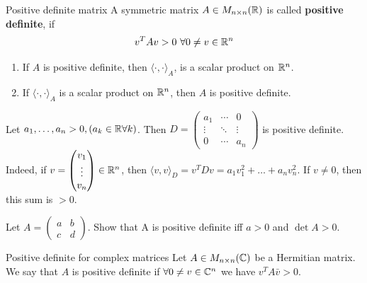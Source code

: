 \documentclass[12pt]{article}
\begin{document}
\begin{definition}{Positive definite matrix}{}
    A symmetric matrix $A \in M_{n \times n}(\mathbb{R})$ is called \textbf{positive definite}, if
    $$
        v^TAv > 0 \ \forall 0 \neq v \in \mathbb{R}^n
    $$
\end{definition}

\begin{remark}{}{}
    \begin{enumerate}
        \item If $A$ is positive definite, then $\langle \cdot, \cdot \rangle_A$, is a scalar product on $\mathbb{R}^n$.
        \item If $\langle \cdot, \cdot \rangle_A$ is a scalar product on $\mathbb{R}^n$, then $A$ is positive definite.
    \end{enumerate}
\end{remark}

\begin{example}{}{}
    Let $a_1, \dots, a_n > 0,  (a_k \in \mathbb{R} \forall k)$. Then 
        $
            D = \begin{pmatrix}
                    a_{1} & \cdots & 0 \\
                    \vdots & \ddots & \vdots \\
                    0      & \cdots & a_{n}
                \end{pmatrix}
        $
        is positive definite. Indeed, if $v = \begin{pmatrix} v_1 \\ \vdots \\ v_n \end{pmatrix} \in \mathbb{R}^n$, then $\langle v, v \rangle_D = v^T D v = a_1v_1^2 + \dots + a_nv_n^2$. If $v \neq 0$, then this sum is $> 0$.
\end{example}

\begin{exercise}{}{}
    Let $A = \begin{pmatrix}
        a & b \\
        c & d
    \end{pmatrix}$. Show that A is positive definite iff $a > 0$ and $\det A > 0$.
\end{exercise}

\begin{definition}{Positive definite for complex matrices}{}
    Let $A \in M_{n \times n}(\mathbb{C})$ be a Hermitian matrix. We say that $A$ is positive definite if $\forall 0 \neq v \in \mathbb{C}^n$ we have $v^T A \bar{v} > 0$.
\end{definition}
\end{document}
